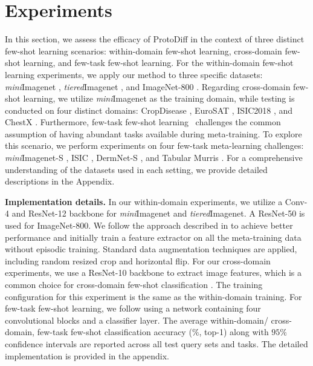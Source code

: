
\section{Experiments}

In this section, we assess the efficacy of ProtoDiff in the context of three distinct few-shot learning scenarios: within-domain few-shot learning, cross-domain few-shot learning, and few-task few-shot learning.
%
For the within-domain few-shot learning experiments, we apply our method to three specific datasets: \textit{mini}Imagenet \cite{vinyals2016matching}, \textit{tiered}Imagenet \cite{ren2018meta}, and ImageNet-800 \cite{chen2021meta}.
%
Regarding cross-domain few-shot learning, we utilize \textit{mini}Imagenet \cite{vinyals2016matching} as the training domain, while testing is conducted on four distinct domains: CropDisease \cite{mohanty2016}, EuroSAT \cite{helber2019eurosat}, ISIC2018 \cite{tschandl2018ham10000}, and ChestX \cite{wang2017chestx}.
%
Furthermore, few-task few-shot learning~\cite{yao2021meta} challenges the common assumption of having abundant tasks available during meta-training. To explore this scenario, we perform experiments on four few-task meta-learning challenges: \textit{mini}Imagenet-S \cite{vinyals2016matching}, ISIC \cite{milton2019automated}, DermNet-S \cite{Dermnetdataset}, and Tabular Murris \cite{cao2020concept}.
%
For a comprehensive understanding of the datasets used in each setting, we provide detailed descriptions in the Appendix.


\textbf{Implementation details.} 
In our within-domain experiments, we utilize a Conv-4 and ResNet-12 backbone for \textit{mini}Imagenet and \textit{tiered}Imagenet. A ResNet-50 is used for ImageNet-800. We follow the approach described in \cite{chen2021meta} to achieve better performance and initially train a feature extractor on all the meta-training data without episodic training.  Standard data augmentation techniques are applied, including random resized crop and horizontal flip. 
%
For our cross-domain experiments, we use a ResNet-10 backbone to extract image features, which is a common choice for cross-domain few-shot classification \cite{ye20, guo2020broader}. The training configuration for this experiment is the same as the within-domain training. 
%
For few-task few-shot learning, we follow \cite{yao2021meta} using a network containing four convolutional blocks and a classifier layer. The average within-domain/ cross-domain, few-task few-shot classification accuracy ($\%$, top-1) along with $95\%$ confidence intervals are reported across all test query sets and tasks. The detailed implementation is provided in the appendix.


